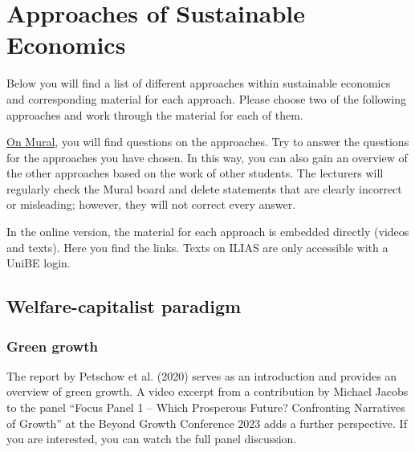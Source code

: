 \documentclass[
  british,
  a4paper,
  DIV=11,
  numbers=noendperiod,
  oneside,
  openany]{scrreprt}
\begin{document}
\section{Approaches of Sustainable
Economics}\label{approaches-of-sustainable-economics}

\begin{tcolorbox}[enhanced jigsaw, arc=.35mm, bottomrule=.15mm, bottomtitle=1mm, breakable, colback=white, colbacktitle=quarto-callout-caution-color!10!white, colframe=quarto-callout-caution-color-frame, coltitle=black, left=2mm, leftrule=.75mm, opacityback=0, opacitybacktitle=0.6, rightrule=.15mm, title={Self-study phase}, titlerule=0mm, toprule=.15mm, toptitle=1mm]

Below you will find a list of different approaches within sustainable
economics and corresponding material for each approach. Please choose
two of the following approaches and work through the material for each
of them.

\href{https://app.mural.co/t/cde6674/m/cde6674/1759743384617/4b38e44dea858b12fbb1cca4bc38b88505fed944?sender=ua98dc58f8437b9b336bb4662}{On
Mural}, you will find questions on the approaches. Try to answer the
questions for the approaches you have chosen. In this way, you can also
gain an overview of the other approaches based on the work of other
students. The lecturers will regularly check the Mural board and delete
statements that are clearly incorrect or misleading; however, they will
not correct every answer.

\end{tcolorbox}

In the online version, the material for each approach is embedded
directly (videos and texts). Here you find the links. Texts on ILIAS are
only accessible with a UniBE login.

\subsection{Welfare-capitalist
paradigm}\label{welfare-capitalist-paradigm-1}

\subsubsection{Green growth}\label{green-growth-1}

The report by Petschow et al. (2020) serves as an introduction and
provides an overview of green growth. A video excerpt from a
contribution by Michael Jacobs to the panel ``Focus Panel 1 -- Which
Prosperous Future? Confronting Narratives of Growth'' at the Beyond
Growth Conference 2023 adds a further perspective. If you are
interested, you can watch the full panel discussion.
\end{document}
